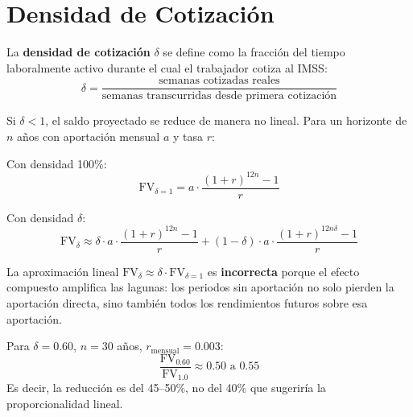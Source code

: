 \documentclass[11pt,a4paper]{report}
\begin{document}
\section{Densidad de Cotizaci\'on}

\begin{tcolorbox}[colback=blue!5!white, colframe=blue!75!black, title=\textbf{Definici\'on Formal: Densidad de Cotizaci\'on}]
La \textbf{densidad de cotizaci\'on} $\delta$ se define como la fracci\'on del tiempo laboralmente activo durante el cual el trabajador cotiza al IMSS:
\[
  \delta = \frac{\text{semanas cotizadas reales}}{\text{semanas transcurridas desde primera cotizaci\'on}}
\]

Si $\delta < 1$, el saldo proyectado se reduce de manera no lineal. Para un horizonte de $n$ a\~nos con aportaci\'on mensual $a$ y tasa $r$:

Con densidad 100\%:
\[
  \text{FV}_{\delta=1} = a \cdot \frac{(1+r)^{12n} - 1}{r}
\]

Con densidad $\delta$:
\[
  \text{FV}_\delta \approx \delta \cdot a \cdot \frac{(1+r)^{12n} - 1}{r} + (1-\delta) \cdot a \cdot \frac{(1+r)^{12n\delta} - 1}{r}
\]

La aproximaci\'on lineal $\text{FV}_\delta \approx \delta \cdot \text{FV}_{\delta=1}$ es \textbf{incorrecta} porque el efecto compuesto amplifica las lagunas: los periodos sin aportaci\'on no solo pierden la aportaci\'on directa, sino tambi\'en todos los rendimientos futuros sobre esa aportaci\'on.

Para $\delta = 0.60$, $n = 30$ a\~nos, $r_{\text{mensual}} = 0.003$:
\[
  \frac{\text{FV}_{0.60}}{\text{FV}_{1.0}} \approx 0.50 \text{ a } 0.55
\]
Es decir, la reducci\'on es del 45--50\%, no del 40\% que sugerir\'ia la proporcionalidad lineal.
\end{tcolorbox}
\end{document}
